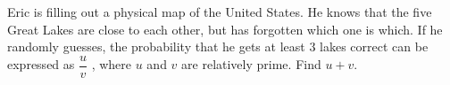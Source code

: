 Eric is filling out a physical map of the United States. He knows that the five Great Lakes are close to each other, but has forgotten which one is which. If he randomly guesses, the probability that he gets at least $3$ lakes correct can be expressed as $\dfrac{u}{v}$ , where $u$ and $v$ are relatively prime. Find $u + v$.
